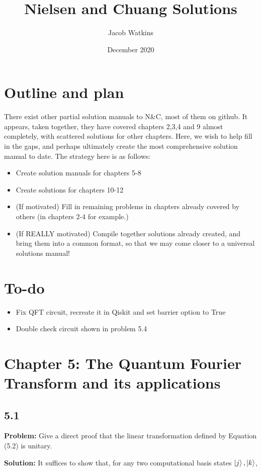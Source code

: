 \documentclass{article}
\title{Nielsen and Chuang Solutions}
\author{Jacob Watkins}
\date{December 2020}
\begin{document}
\maketitle
\section{Outline and plan}
There exist other partial solution manuals to N\&C, most of them on github. It appears, taken together, they have covered chapters 2,3,4 and 9 almost completely, with scattered solutions for other chapters. Here, we wish to help fill in the gaps, and perhaps ultimately create the most comprehensive solution manual to date. The strategy here is as follows:
\begin{itemize}
    \item Create solution manuals for chapters 5-8
    \item Create solutions for chapters 10-12
    \item (If motivated) Fill in remaining problems in chapters already covered by others (in chapters 2-4 for example.)
    \item (If REALLY motivated) Compile together solutions already created, and bring them into a common format, so that we may come closer to a universal solutions manual!
\end{itemize}
\section{To-do}
\begin{itemize}
    \item Fix QFT circuit, recreate it in Qiskit and set barrier option to True
    \item Double check circuit shown in problem 5.4
\end{itemize}

\section*{Chapter 5: The Quantum Fourier Transform and its applications}

\subsection*{5.1}
\textbf{Problem:} Give a direct proof that the linear transformation defined by Equation (5.2) is unitary.

\textbf{Solution:} It suffices to show that, for any two computational basis states $\ket{j}, \ket{k}$,
\end{document}
